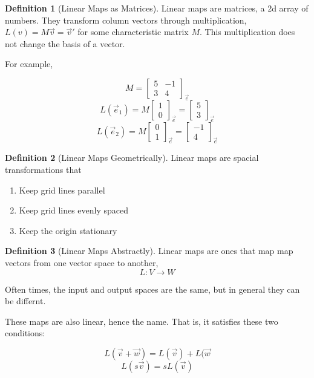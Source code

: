 \documentclass[12pt]{book}
\theoremstyle{plain}
\theoremstyle{definition}
\newtheorem{definition}{Definition}[chapter]
\theoremstyle{ppart}
\theoremstyle{case}
\theoremstyle{solution}
\begin{document}
\begin{definition}[Linear Maps as Matrices]
Linear maps are matrices, a 2d array of numbers. They transform column vectors through
multiplication, $L(v) = M \vec{v} = \vec{v}'$ for some characteristic matrix $M$.
This multiplication does not change the basis of a vector.

For example,

\[
  M =
  \begin{bmatrix}
  5 & -1 \\
  3 & 4
  \end{bmatrix}_{\vec{e}}
\]
\[
  L(\vec{e}_1) =
  M 
  \begin{bmatrix}
  1 \\
  0
  \end{bmatrix}_{\vec{e}}
  =
  \begin{bmatrix}
  5 \\
  3
  \end{bmatrix}_{\vec{e}}
\]
\[
  L(\vec{e}_2) =
  M 
  \begin{bmatrix}
  0 \\
  1
  \end{bmatrix}_{\vec{e}}
  =
  \begin{bmatrix}
  -1 \\
  4
  \end{bmatrix}_{\vec{e}}
\]
\end{definition}

\begin{definition}[Linear Maps Geometrically]
Linear maps are spacial transformations that
\begin{enumerate}
  \item Keep grid lines parallel
  \item Keep grid lines evenly spaced
  \item Keep the origin stationary
\end{enumerate}
\end{definition}

\begin{definition}[Linear Maps Abstractly]
Linear maps are ones that map map vectors from one vector space to another,
\[ L : V \to W \]

Often times, the input and output spaces are the same, but in general they can
be differnt.

These maps are also linear, hence the name. That is, it satisfies these two conditions:

\[ L(\vec{v} + \vec{w}) = L(\vec{v}) + L(\vec{w} \]
\[ L(s \vec{v}) = s L(\vec{v}) \]
\end{definition}
\end{document}

